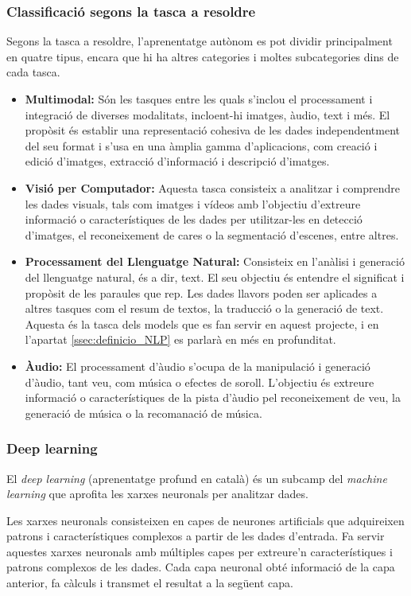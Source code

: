 \subsubsection{Classificació segons la tasca a resoldre}
Segons la tasca a resoldre, l'aprenentatge autònom es pot dividir principalment en quatre tipus, encara que hi ha altres categories i moltes subcategories dins de cada tasca. 
\begin{itemize}
    \item \textbf{Multimodal:} Són les tasques entre les quals s'inclou el processament i integració de diverses modalitats, incloent-hi imatges, àudio, text i més. El propòsit és establir una representació cohesiva de les dades independentment del seu format i s'usa en una àmplia gamma d'aplicacions, com creació i edició d'imatges, extracció d'informació i descripció d'imatges.
    \item \textbf{Visió per Computador:} Aquesta tasca consisteix a analitzar i comprendre les dades visuals, tals com imatges i vídeos amb l'objectiu d'extreure informació o característiques de les dades per utilitzar-les en detecció d'imatges, el reconeixement de cares o la segmentació d'escenes, entre altres.
    \item \textbf{Processament del Llenguatge Natural:} Consisteix en l'anàlisi i generació del llenguatge natural, és a dir, text. El seu objectiu és entendre el significat i propòsit de les paraules que rep. Les dades llavors poden ser aplicades a altres tasques com el resum de textos, la traducció o la generació de text. Aquesta és la tasca dels models que es fan servir en aquest projecte, i en l'apartat \ref{ssec:definicio_NLP} es parlarà en més en profunditat.
    \item \textbf{Àudio:} El processament d'àudio s'ocupa de la manipulació i generació d'àudio, tant veu, com música o efectes de soroll. L'objectiu és extreure informació o característiques de la pista d'àudio pel reconeixement de veu, la generació de música o la recomanació de música. 
\end{itemize}

\subsubsection{Deep learning}
El \textit{deep learning} (aprenentatge profund en català) és un subcamp del \textit{machine learning} que aprofita les xarxes neuronals per analitzar dades. 

Les xarxes neuronals consisteixen en capes de neurones artificials que adquireixen patrons i característiques complexos a partir de les dades d'entrada. Fa servir aquestes xarxes neuronals amb múltiples capes per extreure'n característiques i patrons complexos de les dades. Cada capa neuronal obté informació de la capa anterior, fa càlculs i transmet el resultat a la següent capa. 

